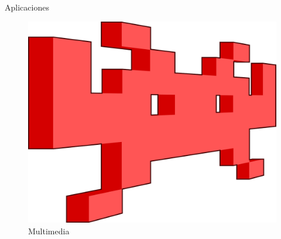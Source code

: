 \documentclass{beamer}
\begin{document}
\begin{frame}[t]{Aplicaciones}
\begin{multicols}{3}
\begin{figure}
	\includegraphics[scale=0.07]{multimedia}
	\caption{Multimedia}
\end{figure}
\end{multicols}
\end{frame}
\end{document}
